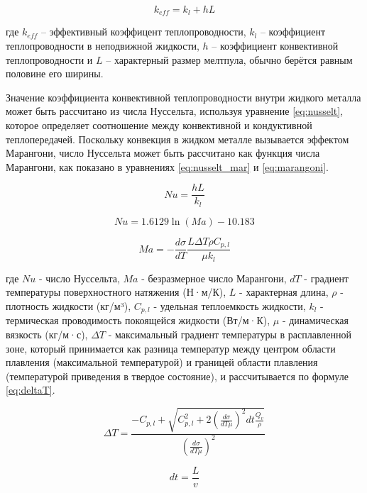 \begin{equation}
    \label{eq:keff}
    k_{eff} = k_l + hL
\end{equation}

\noindent
где $k_{eff}$ -- эффективный коэффицент теплопроводности, $k_l$ -- коэффициент теплопроводности в неподвижной жидкости, $h$ -- коэффициент конвективной теплопроводности и $L$ -- характерный размер мелтпула, обычно берётся равным половине его ширины.  

Значение коэффициента конвективной теплопроводности внутри жидкого металла может быть рассчитано из числа Нуссельта, используя уравнение \ref{eq:nusselt}, которое определяет соотношение между конвективной и кондуктивной теплопередачей. Поскольку конвекция в жидком металле вызывается эффектом Марангони, число Нуссельта может быть рассчитано как функция числа Марангони, как показано в уравнениях \ref{eq:nusselt_mar} и \ref{eq:marangoni}.

\begin{equation}
    \label{eq:nusselt}
    Nu = \frac{hL}{k_l}
\end{equation}

\begin{equation}
    \label{eq:nusselt_mar}
    Nu = 1.6129\ln (Ma) - 10.183
\end{equation}

\begin{equation}
    \label{eq:marangoni}
    Ma = - \frac{d\sigma}{dT} \frac{L\Delta T \rho C_{p,l}}{\mu k_l}
\end{equation}

\noindent
где $Nu$ - число Нуссельта, $Ma$ - безразмерное число Марангони, $dT$ - градиент температуры поверхностного натяжения (Н·м/К), $L$ - характерная длина, $\rho$ - плотность жидкости (кг/м³), $C_{p,l}$ - удельная теплоемкость жидкости, $k_l$ - термическая проводимость покоящейся жидкости (Вт/м·К), $\mu$ - динамическая вязкость (кг/м·с), $\Delta T$ - максимальный градиент температуры в расплавленной зоне, который принимается как разница температур между центром области плавления (максимальной температурой) и границей области плавления (температурой приведения в твердое состояние), и рассчитывается по формуле \ref{eq:deltaT}.

\begin{equation}
    \label{eq:deltaT}
    \Delta T = \frac{
        -C_{p,l} + \sqrt{
            C^2_{p,l} + 2\left(\frac{d\sigma}{dT\mu}\right)^2 dt\frac{Q_v}\rho
            }
        }{
            \left(\frac{d\sigma}{dT\mu}\right)^2
        }
\end{equation}

\begin{equation}
    dt = \frac{L}{v}
\end{equation}

\clearpage